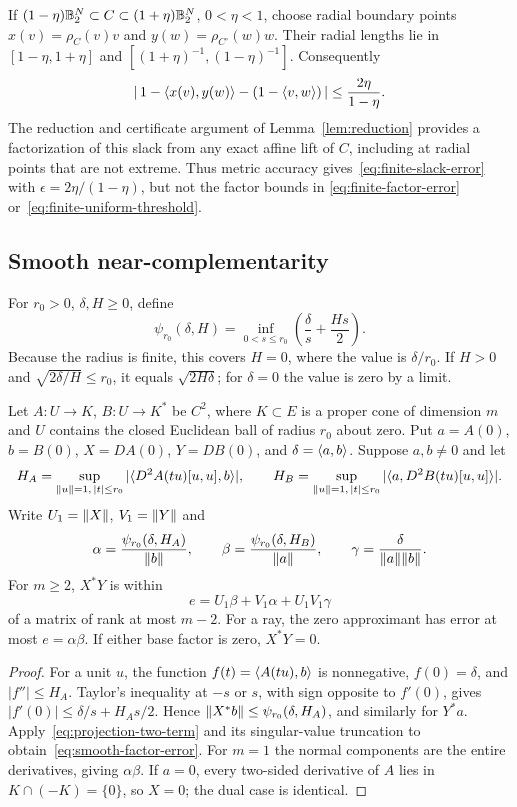 If $(1-\eta)\mathbb B_2^N\subset C\subset(1+\eta)\mathbb B_2^N$, $0<\eta<1$,
choose radial boundary points $x(v)=\rho_C(v)v$ and
$y(w)=\rho_{C^\circ}(w)w$. Their radial lengths lie in
$[1-\eta,1+\eta]$ and $[(1+\eta)^{-1},(1-\eta)^{-1}]$.
Consequently
\[
 |\,1-\langle x(v),y(w)\rangle-(1-\langle v,w\rangle)\,|
 \leq\frac{2\eta}{1-\eta}.
\]
The reduction and certificate argument of Lemma~\ref{lem:reduction}
provides a factorization of this slack from any exact affine lift of $C$,
including at radial points that are not extreme. Thus metric accuracy
gives~\eqref{eq:finite-slack-error} with $\epsilon=2\eta/(1-\eta)$,
but not the factor bounds in \eqref{eq:finite-factor-error}
or~\eqref{eq:finite-uniform-threshold}.

\subsection{Smooth near-complementarity}
For $r_0>0$, $\delta,H\geq0$, define
\begin{equation}\label{eq:psi-interpolation}
 \psi_{r_0}(\delta,H)=\inf_{0<s\leq r_0}
             \left(\frac{\delta}{s}+\frac{Hs}{2}\right).
\end{equation}
Because the radius is finite, this covers $H=0$, where the value is
$\delta/r_0$. If $H>0$ and $\sqrt{2\delta/H}\leq r_0$, it equals
$\sqrt{2H\delta}$; for $\delta=0$ the value is zero by a limit.

\begin{lemma}\label{lem:near-complementarity}
Let $A:U\to K$, $B:U\to K^*$ be $C^2$, where $K\subset E$ is a
proper cone of dimension $m$ and $U$ contains the closed Euclidean ball
of radius $r_0$ about zero. Put
$a=A(0)$, $b=B(0)$, $X=DA(0)$, $Y=DB(0)$, and
$\delta=\langle a,b\rangle$. Suppose $a,b\ne0$ and let
\[
 H_A=\sup_{\lVert u\rVert=1,\,|t|\leq r_0}
       |\langle D^2A(tu)[u,u],b\rangle|,\qquad
 H_B=\sup_{\lVert u\rVert=1,\,|t|\leq r_0}
       |\langle a,D^2B(tu)[u,u]\rangle|.
\]
Write $U_1=\lVert X\rVert$, $V_1=\lVert Y\rVert$ and
\[
 \alpha=\frac{\psi_{r_0}(\delta,H_A)}{\lVert b\rVert},\qquad
 \beta=\frac{\psi_{r_0}(\delta,H_B)}{\lVert a\rVert},\qquad
 \gamma=\frac{\delta}{\lVert a\rVert\lVert b\rVert}.
\]
For $m\geq2$, $X^*Y$ is within
\begin{equation}\label{eq:smooth-factor-error}
 e=U_1\beta+V_1\alpha+U_1V_1\gamma
\end{equation}
of a matrix of rank at most $m-2$. For a ray, the zero approximant
has error at most $e=\alpha\beta$. If either base factor is zero,
$X^*Y=0$.
\end{lemma}
\begin{proof}
For a unit $u$, the function $f(t)=\langle A(tu),b\rangle$ is nonnegative,
$f(0)=\delta$, and $|f''|\leq H_A$. Taylor's inequality at $-s$ or
$s$, with sign opposite to $f'(0)$, gives
$|f'(0)|\leq\delta/s+H_As/2$. Hence
$\lVert X^*b\rVert\leq\psi_{r_0}(\delta,H_A)$, and similarly for $Y^*a$.
Apply~\eqref{eq:projection-two-term} and its singular-value truncation
to obtain~\eqref{eq:smooth-factor-error}. For $m=1$ the normal
components are the entire derivatives, giving $\alpha\beta$.
If $a=0$, every two-sided derivative of $A$ lies in
$K\cap(-K)=\{0\}$, so $X=0$; the dual case is identical.
\end{proof}

